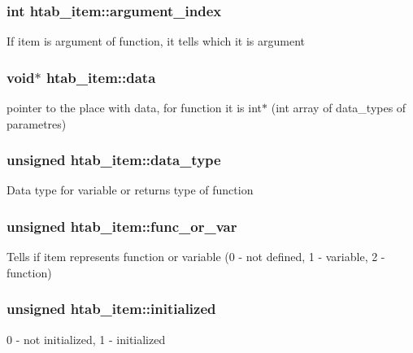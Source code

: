 \subsubsection[{\texorpdfstring{argument\+\_\+index}{argument_index}}]{\setlength{\rightskip}{0pt plus 5cm}int htab\+\_\+item\+::argument\+\_\+index}\hypertarget{structhtab__item_a890983537face39050d82ef9087c12ff}{}\label{structhtab__item_a890983537face39050d82ef9087c12ff}
If item is argument of function, it tells which it is argument 
\subsubsection[{\texorpdfstring{data}{data}}]{\setlength{\rightskip}{0pt plus 5cm}void$\ast$ htab\+\_\+item\+::data}\hypertarget{structhtab__item_aa1b7ec267e7ba427e04f1c2f36fd12b6}{}\label{structhtab__item_aa1b7ec267e7ba427e04f1c2f36fd12b6}
pointer to the place with data, for function it is int$\ast$ (int array of data\+\_\+types of parametres) 
\subsubsection[{\texorpdfstring{data\+\_\+type}{data_type}}]{\setlength{\rightskip}{0pt plus 5cm}unsigned htab\+\_\+item\+::data\+\_\+type}\hypertarget{structhtab__item_a884c03e9b59149a95829a71901276a8b}{}\label{structhtab__item_a884c03e9b59149a95829a71901276a8b}
Data type for variable or returns type of function 
\subsubsection[{\texorpdfstring{func\+\_\+or\+\_\+var}{func_or_var}}]{\setlength{\rightskip}{0pt plus 5cm}unsigned htab\+\_\+item\+::func\+\_\+or\+\_\+var}\hypertarget{structhtab__item_a646c1a75cab8e90247c082d080782803}{}\label{structhtab__item_a646c1a75cab8e90247c082d080782803}
Tells if item represents function or variable (0 -\/ not defined, 1 -\/ variable, 2 -\/ function) 
\subsubsection[{\texorpdfstring{initialized}{initialized}}]{\setlength{\rightskip}{0pt plus 5cm}unsigned htab\+\_\+item\+::initialized}\hypertarget{structhtab__item_a7a297ff53beac4e5bd00982369fee710}{}\label{structhtab__item_a7a297ff53beac4e5bd00982369fee710}
0 -\/ not initialized, 1 -\/ initialized 
